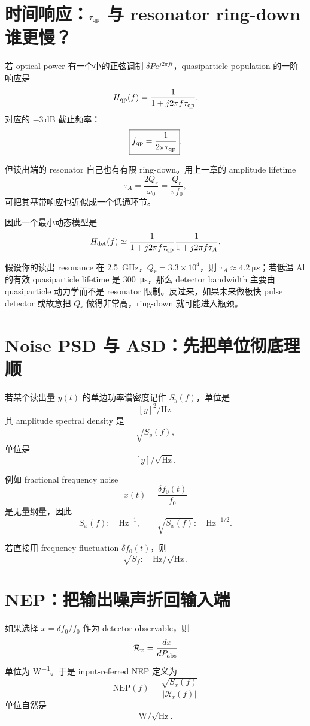 \documentclass[11pt,a4paper,openany]{ctexrep}
\begin{document}
\section{时间响应：$\tau_{\rm qp}$ 与 resonator ring-down 谁更慢？}

若 optical power 有一个小的正弦调制 $\delta P e^{j2\pi ft}$，quasiparticle population 的一阶响应是
\[
H_{\rm qp}(f)=\frac{1}{1+j2\pi f\tau_{\rm qp}}.
\]
对应的 $-3\,\mathrm{dB}$ 截止频率：
\[
\boxed{f_{\rm qp}=\frac{1}{2\pi\tau_{\rm qp}}}.
\]

但读出端的 resonator 自己也有有限 ring-down。用上一章的 amplitude lifetime
\[
\tau_A=\frac{2Q_r}{\omega_0}
=\frac{Q_r}{\pi f_0},
\]
可把其基带响应也近似成一个低通环节。

因此一个最小动态模型是
\[
H_{\rm det}(f)
\simeq
\frac{1}{1+j2\pi f\tau_{\rm qp}}
\frac{1}{1+j2\pi f\tau_A}.
\]

\begin{projectbox}
假设你的读出 resonance 在 \SI{2.5}{GHz}，$Q_r=3.3\times10^4$，则 $\tau_A\approx\SI{4.2}{\micro s}$；若低温 Al 的有效 quasiparticle lifetime 是 \SI{300}{\micro s}，那么 detector bandwidth 主要由 quasiparticle 动力学而不是 resonator 限制。反过来，如果未来做极快 pulse detector 或故意把 $Q_r$ 做得非常高，ring-down 就可能进入瓶颈。
\end{projectbox}

\section{Noise PSD 与 ASD：先把单位彻底理顺}

若某个读出量 $y(t)$ 的单边功率谱密度记作 $S_y(f)$，单位是
\[
[y]^2/\mathrm{Hz}.
\]
其 amplitude spectral density 是
\[
\sqrt{S_y(f)},
\]
单位是
\[
[y]/\sqrt{\mathrm{Hz}}.
\]

例如 fractional frequency noise
\[
x(t)=\frac{\delta f_0(t)}{f_0}
\]
是无量纲量，因此
\[
S_x(f):\quad \mathrm{Hz}^{-1},
\qquad
\sqrt{S_x(f)}:\quad \mathrm{Hz}^{-1/2}.
\]

若直接用 frequency fluctuation $\delta f_0(t)$，则
\[
\sqrt{S_f}:\quad \mathrm{Hz}/\sqrt{\mathrm{Hz}}.
\]

\section{NEP：把输出噪声折回输入端}

如果选择 $x=\delta f_0/f_0$ 作为 detector observable，则
\[
\mathcal R_x=\frac{dx}{dP_{\rm abs}}
\]
单位为 \si{W^{-1}}。于是 input-referred NEP 定义为
\[
\boxed{
\mathrm{NEP}(f)
=
\frac{\sqrt{S_x(f)}}{|\mathcal R_x(f)|}
}
\]
单位自然是
\[
\boxed{\mathrm{W}/\sqrt{\mathrm{Hz}}}.
\]
\end{document}

